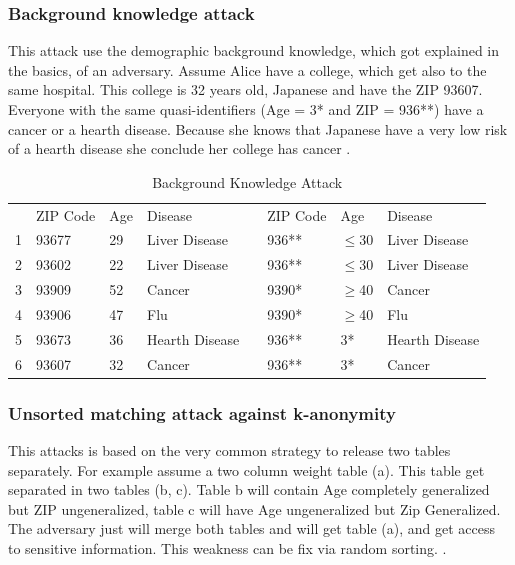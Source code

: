 \documentclass{llncs}
\begin{document}
\subsubsection{Background knowledge attack}
This attack use the demographic background knowledge, which got explained in the basics, of an adversary. Assume Alice have a college, which get also to the same hospital. This college is 32 years old, Japanese and have the ZIP 93607. Everyone with the same quasi-identifiers (Age = 3* and ZIP = 936**) have a cancer or a hearth disease. Because she knows that Japanese have a very low risk of a hearth disease she conclude her college has cancer \cite{ldiversity}.
\begin{table}[]
	\centering
	\caption{Background Knowledge Attack}
	\label{tablebackground}
	\begin{tabular}{@{}llllllll@{}}
		\cmidrule(r){1-4} \cmidrule(l){6-8}
		& ZIP Code & Age & Disease        &  & ZIP Code & Age      & Disease        \\ \cmidrule(r){1-4} \cmidrule(l){6-8} 
		1 & 93677    & 29  & Liver Disease   &  & 936**    & $\leq$30 & Liver Disease   \\
		2 & 93602    & 22  & Liver Disease   &  & 936**    & $\leq$30 & Liver Disease   \\
		3 & 93909    & 52  & Cancer         &  & 9390*    & $\geq$40 & Cancer         \\
		4 & 93906    & 47  & Flu            &  & 9390*    & $\geq$40 & Flu            \\
		5 & 93673    & 36  & Hearth Disease &  & 936**    & 3*       & Hearth Disease \\
		6 & 93607    & 32  & Cancer         &  & 936**    & 3*       & Cancer         \\ \cmidrule(r){1-4} \cmidrule(l){6-8} 
	\end{tabular}
\end{table}

\subsubsection{Unsorted matching attack against k-anonymity}
This attacks is based on the very common strategy to release two tables separately. For example assume a two column weight table (a). This table get separated in two tables (b, c). Table b will contain Age completely generalized but ZIP ungeneralized, table c will have Age ungeneralized but Zip Generalized. The adversary just will merge both tables and will get table (a), and get access to sensitive information. This weakness can be fix via random sorting. \cite{sweeney2002k}.
\end{document}
